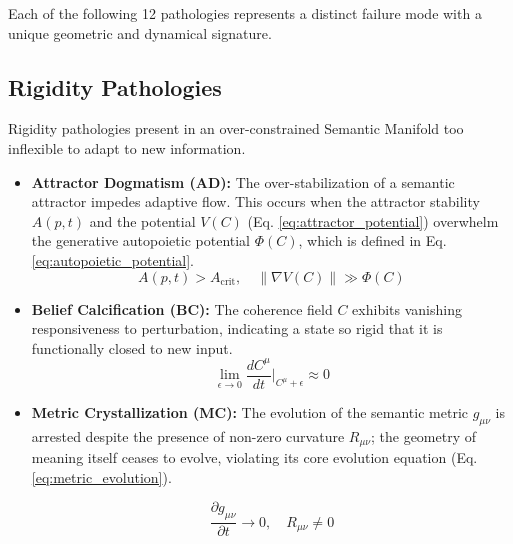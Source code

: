 Each of the following 12 pathologies represents a distinct failure mode with a unique geometric and dynamical signature.


\subsection{Rigidity Pathologies}
\label{16.2.1:rigidity_pathologies}

Rigidity pathologies present in an over-constrained Semantic Manifold too inflexible to adapt to new information.

\begin{itemize}

    \item \textbf{Attractor Dogmatism (AD):} The over-stabilization of a semantic attractor impedes adaptive flow. This occurs when the attractor stability \(A(p,t)\) and the potential \(V(C)\) (Eq. \ref{eq:attractor_potential}) overwhelm the generative autopoietic potential \(\Phi(C)\), which is defined in Eq. \ref{eq:autopoietic_potential}.
    \begin{equation}
    A(p,t) > A_{\text{crit}}, \quad \|\nabla V(C)\| \gg \Phi(C)
    \end{equation}

    \item \textbf{Belief Calcification (BC):} The coherence field \(C\) exhibits vanishing responsiveness to perturbation, indicating a state so rigid that it is functionally closed to new input.
    \begin{equation}
    \lim_{\epsilon \to 0} \frac{dC^\mu}{dt}\bigg|_{C^\mu+\epsilon} \approx 0
    \end{equation}

    \item \textbf{Metric Crystallization (MC):} The evolution of the semantic metric \(g_{\mu\nu}\) is arrested despite the presence of non-zero curvature \(R_{\mu\nu}\); the geometry of meaning itself ceases to evolve, violating its core evolution equation (Eq. \ref{eq:metric_evolution}).
    
    \begin{equation}
    \frac{\partial g_{\mu\nu}}{\partial t} \to 0, \quad R_{\mu\nu} \neq 0
    \end{equation}

\end{itemize}

